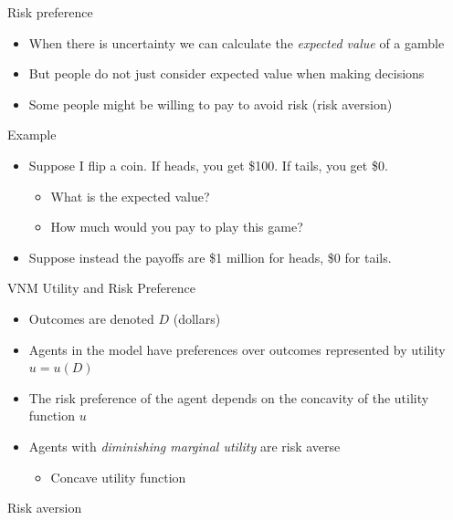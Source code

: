 \documentclass[10pt]{beamer}
\begin{document}
\begin{frame}[label={sec:orgdb5dc03}]{}
\alert{Risk preference} 
\begin{itemize}
\item When there is uncertainty we can calculate the \emph{expected value} of a gamble
\item But people do not just consider expected value when making decisions
\item Some people might be willing to pay to avoid risk (risk aversion)
\end{itemize}
\end{frame}

\begin{frame}[label={sec:org3ec13ab}]{}
\alert{Example}
\begin{itemize}
\item Suppose I flip a coin. If heads, you get \$100. If tails, you get \$0. 
\begin{itemize}
\item What is the expected value?
\item How much would you pay to play this game?
\end{itemize}
\item Suppose instead the payoffs are \$1 million for heads, \$0 for tails.
\end{itemize}
\end{frame}

\begin{frame}[label={sec:org9743b8d}]{}
\alert{VNM Utility and Risk Preference}
\begin{itemize}
\item Outcomes are denoted \(D\) (dollars)
\item Agents in the model have preferences over outcomes represented by utility \(u=u(D)\)
\item The risk preference of the agent depends on the concavity of the utility function \(u\)
\item Agents with \emph{diminishing marginal utility} are risk averse
\begin{itemize}
\item Concave utility function
\end{itemize}
\end{itemize}
\end{frame}

\begin{frame}[label={sec:orgceb4f1d}]{Risk aversion}
\end{frame}
\end{document}
